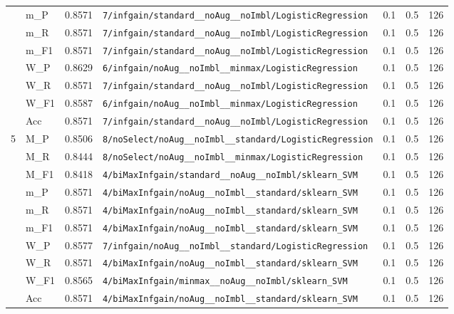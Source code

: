 \begin{table}[htbp]
\begin{tabular}{|c|l|c|>{\ttfamily\footnotesize}p{7.2cm}|c|c|c|}
 & m\_P & 0.8571 & \texttt{7/infgain/standard\_\_noAug\_\_noImbl/LogisticRegression} & 0.1 & 0.5  & 126 \\ 
 & m\_R & 0.8571 & \texttt{7/infgain/standard\_\_noAug\_\_noImbl/LogisticRegression} & 0.1 & 0.5  & 126 \\ 
 & m\_F1 & 0.8571 & \texttt{7/infgain/standard\_\_noAug\_\_noImbl/LogisticRegression} & 0.1 & 0.5  & 126 \\ 
 & W\_P & 0.8629 & \texttt{6/infgain/noAug\_\_noImbl\_\_minmax/LogisticRegression} & 0.1 & 0.5  & 126 \\ 
 & W\_R & 0.8571 & \texttt{7/infgain/standard\_\_noAug\_\_noImbl/LogisticRegression} & 0.1 & 0.5  & 126 \\ 
 & W\_F1 & 0.8587 & \texttt{6/infgain/noAug\_\_noImbl\_\_minmax/LogisticRegression} & 0.1 & 0.5  & 126 \\ 
 & Acc & 0.8571 & \texttt{7/infgain/standard\_\_noAug\_\_noImbl/LogisticRegression} & 0.1 & 0.5  & 126 \\ 
\hline
\multirow{10}{*}{5} & M\_P & 0.8506 & \texttt{8/noSelect/noAug\_\_noImbl\_\_standard/LogisticRegression} & 0.1 & 0.5  & 126 \\ 
 & M\_R & 0.8444 & \texttt{8/noSelect/noAug\_\_noImbl\_\_minmax/LogisticRegression} & 0.1 & 0.5  & 126 \\ 
 & M\_F1 & 0.8418 & \texttt{4/biMaxInfgain/standard\_\_noAug\_\_noImbl/sklearn\_SVM} & 0.1 & 0.5  & 126 \\ 
 & m\_P & 0.8571 & \texttt{4/biMaxInfgain/noAug\_\_noImbl\_\_standard/sklearn\_SVM} & 0.1 & 0.5  & 126 \\ 
 & m\_R & 0.8571 & \texttt{4/biMaxInfgain/noAug\_\_noImbl\_\_standard/sklearn\_SVM} & 0.1 & 0.5  & 126 \\ 
 & m\_F1 & 0.8571 & \texttt{4/biMaxInfgain/noAug\_\_noImbl\_\_standard/sklearn\_SVM} & 0.1 & 0.5  & 126 \\ 
 & W\_P & 0.8577 & \texttt{7/infgain/noAug\_\_noImbl\_\_standard/LogisticRegression} & 0.1 & 0.5  & 126 \\ 
 & W\_R & 0.8571 & \texttt{4/biMaxInfgain/noAug\_\_noImbl\_\_standard/sklearn\_SVM} & 0.1 & 0.5  & 126 \\ 
 & W\_F1 & 0.8565 & \texttt{4/biMaxInfgain/minmax\_\_noAug\_\_noImbl/sklearn\_SVM} & 0.1 & 0.5  & 126 \\ 
 & Acc & 0.8571 & \texttt{4/biMaxInfgain/noAug\_\_noImbl\_\_standard/sklearn\_SVM} & 0.1 & 0.5  & 126 \\ 
\hline
\end{tabular}
\end{table}